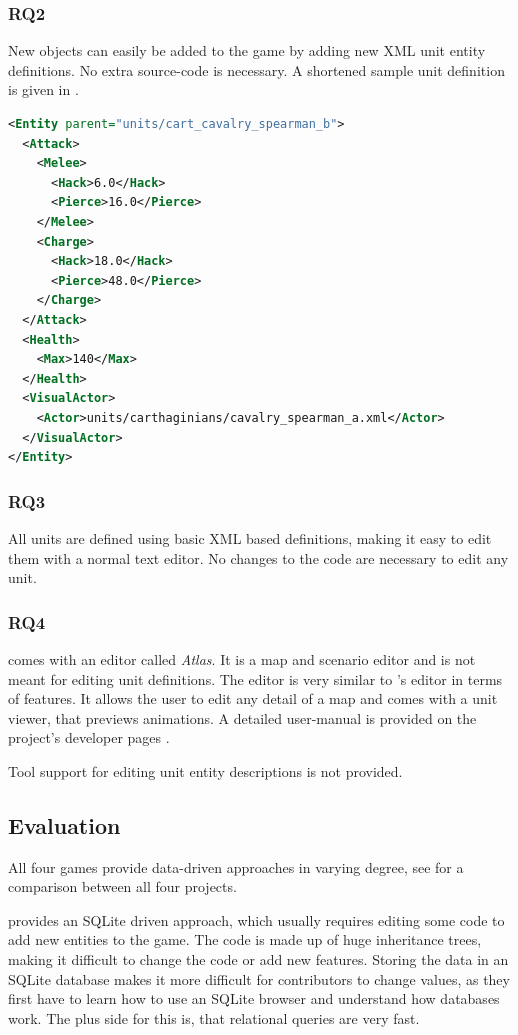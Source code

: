 \subsubsection{RQ2}
New objects can easily be added to the game by adding new XML unit entity definitions. No extra source-code is
necessary. A shortened sample unit definition is given in .

\begin{lstlisting}[language=XML,caption=A basic \AD{} (shortened) unit definition in XML, label=0adxml]
<Entity parent="units/cart_cavalry_spearman_b">
  <Attack>
    <Melee>
      <Hack>6.0</Hack>
      <Pierce>16.0</Pierce>
    </Melee>
    <Charge>
      <Hack>18.0</Hack>
      <Pierce>48.0</Pierce>
    </Charge>
  </Attack>
  <Health>
    <Max>140</Max>
  </Health>
  <VisualActor>
    <Actor>units/carthaginians/cavalry_spearman_a.xml</Actor>
  </VisualActor>
</Entity>
\end{lstlisting}

\subsubsection{RQ3}
All units are defined using basic XML based definitions, making it easy to edit them with a normal text editor. No
changes to the code are necessary to edit any unit.

\subsubsection{RQ4}
\AD{} comes with an editor called \textit{Atlas}. It is a map and scenario editor and is not meant for editing unit
definitions. The editor is very similar to \GLEST{}'s editor in terms of features. It allows the user to edit any detail
of a map and comes with a unit viewer, that previews animations. A detailed user-manual is provided on the project's developer
pages \cite{0adeditor}.

Tool support for editing unit entity descriptions is not provided.

\subsection{Evaluation}
All four games provide data-driven approaches in varying degree, see  for a comparison between all
four projects.

\UH{} provides an SQLite driven approach, which usually requires editing some code to add new entities to the game. The
code is made up of huge inheritance trees, making it difficult to change the code or add new features. Storing the data
in an SQLite database makes it more difficult for contributors to change values, as they first have to learn how to use
an SQLite browser and understand how databases work. The plus side for this is, that relational queries are very fast.

